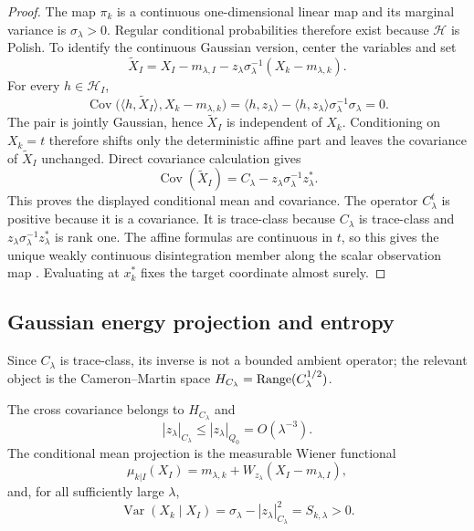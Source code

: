 \begin{proof}
The map $\pi_k$ is a continuous one-dimensional linear map and its marginal
variance is $\sigma_\lambda>0$.  Regular conditional probabilities therefore
exist because $\mathcal{H}$ is Polish.  To identify the continuous Gaussian
version, center the variables and set
\[
  \widetilde X_I
  =X_I-m_{\lambda,I}-z_\lambda\sigma_\lambda^{-1}(X_k-m_{\lambda,k}).
\]
For every $h\in\mathcal{H}_I$,
\[
  \operatorname{Cov}\bigl(\langle h,\widetilde X_I\rangle,
  X_k-m_{\lambda,k}\bigr)
  =\langle h,z_\lambda\rangle
   -\langle h,z_\lambda\rangle\sigma_\lambda^{-1}\sigma_\lambda
  =0.
\]
The pair is jointly Gaussian, hence $\widetilde X_I$ is independent of $X_k$.
Conditioning on $X_k=t$ therefore shifts only the deterministic affine part and
leaves the covariance of $\widetilde X_I$ unchanged.  Direct covariance
calculation gives
\[
  \operatorname{Cov}(\widetilde X_I)
  =C_\lambda-z_\lambda\sigma_\lambda^{-1}z_\lambda^*.
\]
This proves the displayed conditional mean and covariance.  The operator
$C_\lambda^t$ is positive because it is a covariance.  It is trace-class because
$C_\lambda$ is trace-class and $z_\lambda\sigma_\lambda^{-1}z_\lambda^*$ is
rank one.  The affine formulas are continuous in $t$, so this gives the unique
weakly continuous disintegration member along the scalar observation map
\cite{bogachev1998gaussian,lagatta2013continuous,steinwart2024conditioning,chen2024gaussian}.  Evaluating at $x_k^*$ fixes
the target coordinate almost surely.
\end{proof}

\subsection{Gaussian energy projection and entropy}

Since $C_\lambda$ is trace-class, its inverse is not a bounded ambient operator;
the relevant object is the Cameron--Martin space
$H_{C_\lambda}=\operatorname{Range}(C_\lambda^{1/2})$.

\begin{lemma}
\label{lem:conditional_predictor}
The cross covariance belongs to $H_{C_\lambda}$ and
\[
  |z_\lambda|_{C_\lambda}
  \le |z_\lambda|_{Q_0}=O(\lambda^{-3}).
\]
The conditional mean projection is the measurable Wiener functional
\[
  \mu_{k|I}(X_I)
  =
  m_{\lambda,k}
  +W_{z_\lambda}(X_I-m_{\lambda,I}),
\]
and, for all sufficiently large $\lambda$,
\[
  \operatorname{Var}(X_k\mid X_I)
  =
  \sigma_\lambda-|z_\lambda|_{C_\lambda}^2
  =S_{k,\lambda}>0.
\]
\end{lemma}

